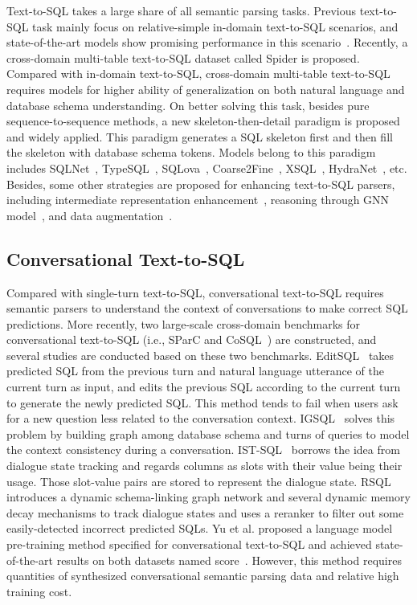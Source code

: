 \documentclass[a4paper]{article}
\begin{document}
Text-to-SQL takes a large share of all semantic parsing tasks. Previous text-to-SQL task mainly focus on relative-simple in-domain text-to-SQL scenarios, and state-of-the-art models show promising performance in this scenario~\cite{zhongSeq2SQL2017,sun2018semantic,guo2019content}.
Recently, a cross-domain multi-table text-to-SQL dataset called Spider is proposed\cite{yu2018spider}. Compared with in-domain text-to-SQL, cross-domain multi-table text-to-SQL requires models for higher ability of generalization on both natural language and database schema understanding. On better solving this task, besides pure sequence-to-sequence methods, a new skeleton-then-detail paradigm is proposed and widely applied. This paradigm generates a SQL skeleton first and then fill the skeleton with database schema tokens. Models belong to this paradigm includes SQLNet~\cite{xu2017sqlnet}, TypeSQL~\cite{yu2018typesql}, SQLova~\cite{hwang2019comprehensive}, Coarse2Fine~\cite{dong2018coarse}, XSQL~\cite{he2019x}, HydraNet~\cite{lyu2020hybrid}, etc. Besides, some other strategies are proposed for enhancing text-to-SQL parsers, including intermediate representation enhancement~\cite{yu2018syntaxsqlnet,guo2019towards,herzig2021unlocking}, reasoning through GNN model~\cite{bogin2019representing,bogin2019global,wang2019rat,cao2021lgesql,chen2021shadowgnn}, and data augmentation~\cite{andreas2019good,wang2021learning}.

\subsection{Conversational Text-to-SQL}
Compared with single-turn text-to-SQL, conversational text-to-SQL requires semantic parsers to understand the context of conversations to make correct SQL predictions. More recently, two large-scale cross-domain benchmarks for conversational text-to-SQL (i.e., SParC and CoSQL~\cite{yu2019sparc,yu2019cosql}) are constructed, and several studies are conducted based on these two benchmarks. EditSQL~\cite{zhang2019editing} takes predicted SQL from the previous turn and natural language utterance of the current turn as input, and edits the previous SQL according to the current turn to generate the newly predicted SQL. This method tends to fail when users ask for a new question less related to the conversation context. IGSQL~\cite{cai2020igsql} solves this problem by building graph among database schema and turns of queries to model the context consistency during a conversation. IST-SQL~\cite{wang2020tracking} borrows the idea from dialogue state tracking and regards columns as slots with their value being their usage. Those slot-value pairs are stored to represent the dialogue state.  RSQL~\cite{hui2021dynamic} introduces a dynamic schema-linking graph network and several dynamic memory decay mechanisms to track dialogue states and uses a reranker to filter out some easily-detected incorrect predicted SQLs.  Yu et al. proposed a language model pre-training method specified for conversational text-to-SQL and achieved state-of-the-art results on both datasets named score~\cite{yu2020score}. However, this method requires quantities of synthesized conversational semantic parsing data and relative high training cost.
\end{document}
